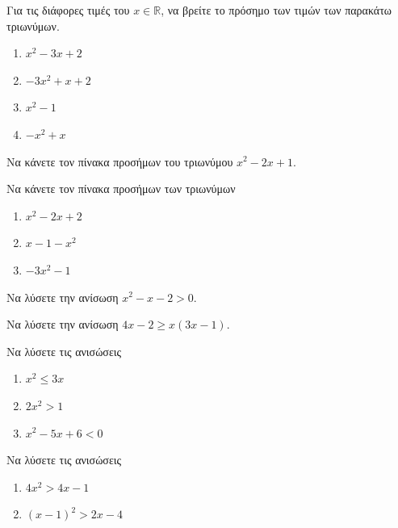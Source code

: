 \documentclass{../../presentation}
\begin{document}
\begin{askisi}
  Για τις διάφορες τιμές του $x\in\mathbb{R}$, να βρείτε το πρόσημο των τιμών των παρακάτω τριωνύμων.
  \begin{enumerate}[<+->]
    \item $x^2-3x+2$
    \item $-3x^2+x+2$
    \item $x^2-1$
    \item $-x^2+x$
  \end{enumerate}
\end{askisi}

\begin{askisi}
  Να κάνετε τον πίνακα προσήμων του τριωνύμου $x^2-2x+1$.
\end{askisi}

\begin{askisi}
  Να κάνετε τον πίνακα προσήμων των τριωνύμων
  \begin{enumerate}[<+->]
    \item $x^2-2x+2$
    \item $x-1-x^2$
    \item $-3x^2-1$
  \end{enumerate}
\end{askisi}

\begin{askisi}
  Να λύσετε την ανίσωση $x^2-x-2>0$.
\end{askisi}

\begin{askisi}
  Να λύσετε την ανίσωση $4x-2\ge x(3x-1)$.
\end{askisi}

\begin{askisi}
  Να λύσετε τις ανισώσεις
  \begin{enumerate}[<+->]
    \item $x^2\le 3x$
    \item $2x^2>1$
    \item $x^2-5x+6<0$
  \end{enumerate}
\end{askisi}

\begin{askisi}
  Να λύσετε τις ανισώσεις
  \begin{enumerate}[<+->]
    \item $4x^2>4x-1$
    \item $(x-1)^2>2x-4$
  \end{enumerate}
\end{askisi}
\end{document}
